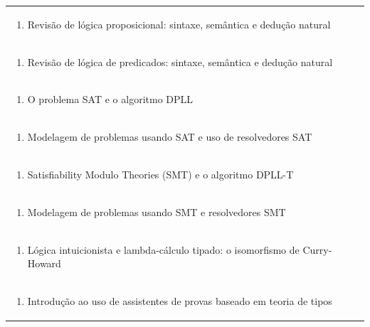 \documentclass[11pt]{article}
\begin{document}
\begin{center}
\begin{longtable}{|p{4cm}|p{4cm}|p{4cm}|p{4cm}|}
\multicolumn{4}{|p{\dimexpr 16cm + 6\tabcolsep\relax}|}{\begin{enumerate}[start=2]\item Revisão de lógica proposicional: sintaxe, semântica e dedução natural\end{enumerate}}\\
\multicolumn{4}{|p{\dimexpr 16cm + 6\tabcolsep\relax}|}{\begin{enumerate}[start=3]\item Revisão de lógica de predicados: sintaxe, semântica e dedução natural\end{enumerate}}\\
\multicolumn{4}{|p{\dimexpr 16cm + 6\tabcolsep\relax}|}{\begin{enumerate}[start=4]\item O problema SAT e o algoritmo DPLL\end{enumerate}}\\
\multicolumn{4}{|p{\dimexpr 16cm + 6\tabcolsep\relax}|}{\begin{enumerate}[start=5]\item Modelagem de problemas usando SAT e uso de resolvedores SAT\end{enumerate}}\\
\multicolumn{4}{|p{\dimexpr 16cm + 6\tabcolsep\relax}|}{\begin{enumerate}[start=6]\item Satisfiability Modulo Theories (SMT) e o algoritmo DPLL-T\end{enumerate}}\\
\multicolumn{4}{|p{\dimexpr 16cm + 6\tabcolsep\relax}|}{\begin{enumerate}[start=7]\item Modelagem de problemas usando SMT e resolvedores SMT\end{enumerate}}\\
\multicolumn{4}{|p{\dimexpr 16cm + 6\tabcolsep\relax}|}{\begin{enumerate}[start=8]\item Lógica intuicionista e lambda-cálculo tipado: o isomorfismo de Curry-Howard\end{enumerate}}\\
\multicolumn{4}{|p{\dimexpr 16cm + 6\tabcolsep\relax}|}{\begin{enumerate}[start=9]\item Introdução ao uso de assistentes de provas baseado em teoria de tipos\end{enumerate}}\\

\end{longtable}
\end{center}
\end{document}
